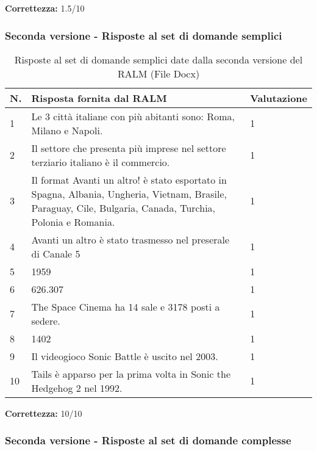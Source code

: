 \textbf{Correttezza:} 1.5/10

\subsubsection{Seconda versione - Risposte al set di domande semplici}

\begin{table}[H]
    \centering
    \begin{tabular}{|p{0.5cm} |p{6cm} |p{2cm}|}
        \hline
        \textbf{N}. & \textbf{Risposta fornita dal RALM} & \textbf{Valutazione} \\
        \hline
        1 & Le 3 città italiane con più abitanti sono: Roma, Milano e Napoli. & 1 \\
        \hline
        2 & Il settore che presenta più imprese nel settore terziario italiano è il commercio. & 1 \\
        \hline
        3 & Il format Avanti un altro! è stato esportato in Spagna, Albania, Ungheria, Vietnam, Brasile, Paraguay, Cile, Bulgaria, Canada, Turchia, Polonia e Romania. & 1 \\
        \hline
        4 & Avanti un altro è stato trasmesso  nel preserale di Canale 5 & 1 \\
        \hline
        5 & 1959 & 1 \\
        \hline
        6 & 626.307 & 1 \\
        \hline
        7 & The Space Cinema ha 14 sale e 3178 posti a sedere. & 1 \\
        \hline
        8 & 1402 & 1 \\
        \hline
        9 & Il videogioco Sonic Battle è uscito nel 2003. & 1 \\
        \hline
        10 & Tails è apparso per la prima volta in Sonic the Hedgehog 2 nel 1992. & 1 \\
        \hline
    \end{tabular}
    \caption{Risposte al set di domande semplici date dalla seconda versione del RALM (File Docx)}
\end{table}

\textbf{Correttezza:} 10/10

\subsubsection{Seconda versione - Risposte al set di domande complesse}

